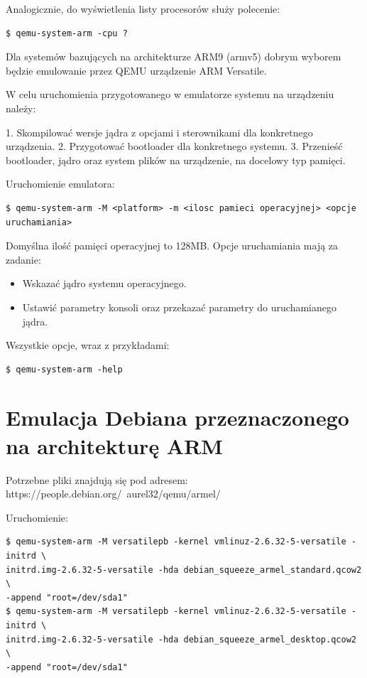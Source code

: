 Analogicznie, do wyświetlenia listy procesorów służy polecenie:
\begin{lstlisting}
$ qemu-system-arm -cpu ? 
\end{lstlisting}

Dla systemów bazujących na architekturze ARM9 (armv5) dobrym wyborem będzie emulowanie przez QEMU urządzenie ARM Versatile. 

W celu uruchomienia przygotowanego w emulatorze systemu na urządzeniu należy:

1. Skompilować wersje jądra z opcjami i sterownikami dla konkretnego urządzenia.
2. Przygotować bootloader dla konkretnego systemu.
3. Przenieść bootloader, jądro oraz system plików na urządzenie, na docelowy typ pamięci.


Uruchomienie emulatora:

\begin{lstlisting}
$ qemu-system-arm -M <platform> -m <ilosc pamieci operacyjnej> <opcje uruchamiania>
\end{lstlisting}
\newpage
Domyślna ilość pamięci operacyjnej to 128MB. Opcje uruchamiania mają za zadanie:

\begin{itemize}
	\item Wskazać jądro systemu operacyjnego.
	\item Ustawić parametry konsoli oraz przekazać parametry do uruchamianego jądra.
\end{itemize}

Wszystkie opcje, wraz z przykładami:
\begin{lstlisting}
$ qemu-system-arm -help
\end{lstlisting}

\newpage 

\section{Emulacja Debiana przeznaczonego na architekturę ARM}


Potrzebne pliki znajdują się pod adresem: https://people.debian.org/~aurel32/qemu/armel/
\newline


Uruchomienie:
\begin{lstlisting}
$ qemu-system-arm -M versatilepb -kernel vmlinuz-2.6.32-5-versatile -initrd \ 
initrd.img-2.6.32-5-versatile -hda debian_squeeze_armel_standard.qcow2 \
-append "root=/dev/sda1"
$ qemu-system-arm -M versatilepb -kernel vmlinuz-2.6.32-5-versatile -initrd \
initrd.img-2.6.32-5-versatile -hda debian_squeeze_armel_desktop.qcow2 \
-append "root=/dev/sda1"
\end{lstlisting}



